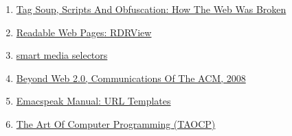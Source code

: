 \documentclass[11pt]{article}
\begin{document}
\begin{enumerate}
\item \href{https://idlewords.com/talks/website\_obesity.htm}{Tag Soup, Scripts And Obfuscation: How The Web Was Broken}
\item \href{https://github.com/eafer/rdrview}{Readable Web Pages: RDRView}
\item \href{https://emacspeak.blogspot.com/2024/03/updated-smart-media-selector-for-audio.html}{smart media selectors}
\item \href{https://research.google/blog/beyond-web-20/?hl=in\&m=1}{Beyond Web 2.0, Communications
Of The ACM, 2008}
\item \href{https://tvraman.github.io/emacspeak/manual/URL-Templates.html}{Emacspeak Manual: URL Templates}
\item \href{https://www-cs-faculty.stanford.edu/\~knuth/taocp.html}{The Art Of Computer Programming (TAOCP)}
\end{enumerate}
\end{document}
